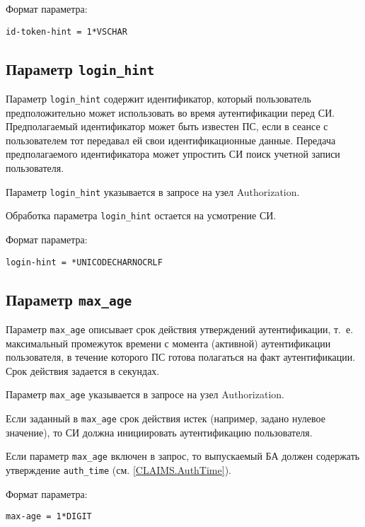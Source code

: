 Формат параметра:
\begin{lstlisting}
id-token-hint = 1*VSCHAR
\end{lstlisting}

\subsection{Параметр \lstinline{login_hint}}\label{PARAMS.LoginHint}

Параметр \lstinline{login_hint} содержит идентификатор, который пользователь 
предположительно может использовать во время аутентификации перед СИ. 
%
Предполагаемый идентификатор может быть известен ПС, если в сеансе с 
пользователем тот передавал ей свои идентификационные данные.
%
Передача предполагаемого идентификатора может упростить СИ поиск учетной записи 
пользователя.

Параметр \lstinline{login_hint} указывается в запросе на узел Authorization.

Обработка параметра \lstinline{login_hint} остается на усмотрение СИ.

Формат параметра:
\begin{lstlisting}
login-hint = *UNICODECHARNOCRLF
\end{lstlisting}

\subsection{Параметр \lstinline{max_age}}\label{PARAMS.MaxAge} 

Параметр \lstinline{max_age} описывает срок действия утверждений
аутентификации, т.~е. максимальный промежуток времени с момента (активной)
аутентификации пользователя, в течение которого ПС готова полагаться на факт
аутентификации.
%
Срок действия задается в секундах.

Параметр \lstinline{max_age} указывается в запросе на узел Authorization.

Если заданный в \lstinline{max_age} срок действия истек (например, задано 
нулевое значение), то СИ должна инициировать аутентификацию пользователя.

Если параметр \lstinline{max_age} включен в запрос, то выпускаемый БА должен 
содержать утверждение \lstinline{auth_time} (см. \ref{CLAIMS.AuthTime}).

Формат параметра:
\begin{lstlisting}
max-age = 1*DIGIT
\end{lstlisting}

